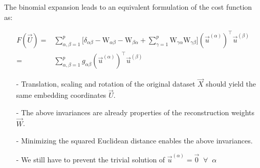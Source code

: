\begin{frame}
The binomial expansion leads to an equivalent formulation of the cost function as:

\svspace{-5mm}

\begin{align}
F(\vec{U}) =& 
\sum_{\alpha, \beta=1}^{p}
\Big\lbrack
\delta_{\alpha \beta} - \mathrm{W}_{\alpha \beta} - \mathrm{W}_{\beta \alpha} + \sum_{\gamma=1}^{p} \mathrm{W}_{\gamma \alpha} \mathrm{W}_{\gamma \beta} \Big\rbrack (\vec{u}^{(\alpha)})^\top \vec{u}^{(\beta)} \\
=& \sum_{\alpha, \beta=1}^{p} g_{\alpha \beta} (\vec{u}^{(\alpha)})^\top \vec{u}^{(\beta)}
\end{align}


\pause

\svspace{-3mm
}
\begin{itemize}
\item[-] Translation, scaling and rotation of the original dataset $\vec X$ should yield the same embedding coordinates $\vec U$.
\item[-] The above invariances are already properties of the reconstruction weights $\vec W$.
\item[-] Minimizing the squared Euclidean distance enables the above invariances.
\item[-] We still have to prevent the trivial solution of $\vec u^{(\alpha)} = \vec 0 \;\; \forall \;\; \alpha$
\end{itemize}

\end{frame}



